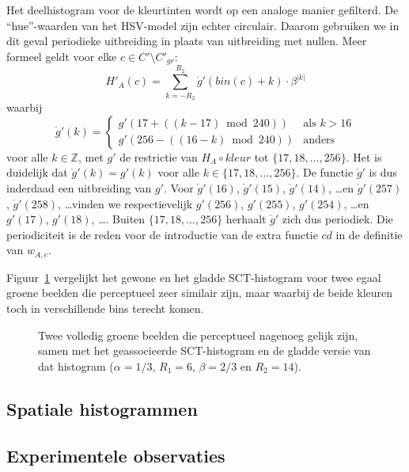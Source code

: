 Het deelhistogram voor de kleurtinten wordt op een analoge manier gefilterd. 
De ``hue''-waarden van het HSV-model zijn echter circulair. Daarom gebruiken we in dit geval
periodieke uitbreiding in plaats van uitbreiding met nullen. Meer formeel geldt voor 
elke $c \in C' \setminus C'_{gr}$:
$$
H'_A(c) = \sum_{k=-R_2}^{R_2} \mathring{g}'(bin(c)+k) \cdot \beta^{|k|}
$$
waarbij
$$
\mathring{g}'(k) = \left\{ \begin{array}{ll}
g'(17  + ((k-17) \bmod 240)) & \textrm{als } k > 16 \\
g'(256 - ((16-k) \bmod 240)) & \textrm{anders}
\end{array} \right.
$$
voor alle $k \in \mathbb{Z}$, met $g'$ de restrictie van $H_A \circ kleur$
tot $\{17,18,\ldots,256\}$. Het is duidelijk dat $\mathring{g}'(k)=g'(k)$ voor alle 
$k \in \{17,18,\ldots,256\}$. De functie $\mathring{g}'$ is dus inderdaad een uitbreiding
van $g'$. Voor $\mathring{g}'(16)$, $\mathring{g}'(15)$, $\mathring{g}'(14)$, \ldots en
$\mathring{g}'(257)$, $\mathring{g}'(258)$, \ldots vinden we respectievelijk
$g'(256)$, $g'(255)$, $g'(254)$, \ldots en $g'(17)$, $g'(18)$, \ldots . Buiten
$\{17,18,\ldots,256\}$ herhaalt $\mathring{g}'$ zich dus periodiek. Die periodiciteit is
de reden voor de introductie van de extra functie $cd$ in de definitie van $w_{A,c}$.  

Figuur~\ref{fig:histogrammen_smoothed_sct} vergelijkt het gewone en het gladde SCT-histogram
voor twee egaal groene beelden die perceptueel zeer similair zijn, maar waarbij de beide kleuren 
toch in verschillende bins terecht komen.

\begin{figure}[tbp]
\begin{center}
\caption{\label{fig:histogrammen_smoothed_sct}Twee volledig groene beelden die perceptueel 
nagenoeg gelijk zijn, samen met het geassocieerde SCT-histogram en de gladde versie van dat 
histogram ($\alpha=1/3$, $R_1=6$, $\beta=2/3$ en $R_2=14$).}
\end{center}
\end{figure}

\subsection{Spatiale histogrammen}


\subsection{Experimentele observaties}